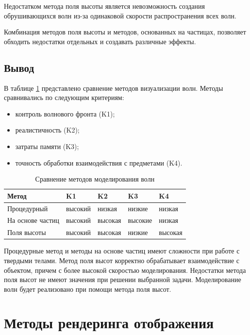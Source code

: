 Недостатком метода поля высоты является невозможность создания обрушивающихся волн  из-за одинаковой скорости распространения всех волн.

Комбинация методов поля высоты и методов, основанных на частицах, позволяет обходить недостатки отдельных \cite{combine} и создавать различные эффекты.

\subsection*{Вывод}

В таблице \ref{tab:compare} представлено сравнение методов визуализации волн. Методы сравнивались по следующим критериям:

\begin{itemize}
	\item контроль волнового фронта (K1);
	\item реалистичность (K2);
	\item затраты памяти (K3);
	\item точность обработки взаимодействия с предметами (K4).
\end{itemize}

\begin{table}[h]
    \caption{Сравнение методов моделирования волн}
    \begin{center}
        \begin{tabular}{|l|l|l|l|l|}
            \hline
            Метод & K1 & K2 & K3 & K4 \\ \hline
            Процедурный & высокий & низкая & низкие & низкая \\ \hline
		    На основе частиц & высокий & высокая & высокие  & низкая \\ \hline
            Поля высоты & высокий & высокая & низкие & высокая  \\ \hline
        \end{tabular}
    \end{center}
    \label{tab:compare}
\end{table}

Процедурные метод и методы на основе частиц имеют сложности при работе с твердыми телами. Метод поля высот корректно обрабатывает взаимодействие с объектом, причем с более высокой скоростью моделирования. Недостатки метода поля высот не имеют значения при решении выбранной задачи. Моделирование волн будет реализовано при помощи метода поля высот.

\section{Методы рендеринга отображения}

